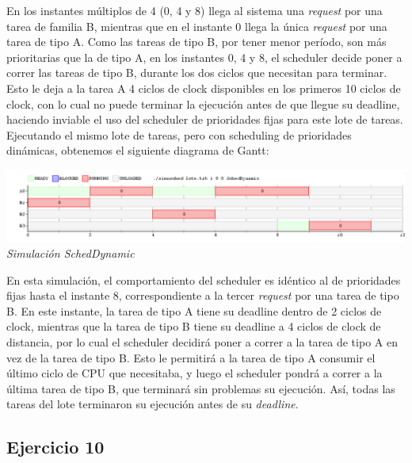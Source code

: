 En los instantes m\'ultiplos de 4 (0, 4 y 8) llega al sistema una \textit{request} por una tarea de familia B, mientras que en el instante 0 llega la \'unica 
\textit{request} por una tarea de tipo A. Como las tareas de tipo B, por tener menor per\'iodo, son m\'as prioritarias que la de tipo A, en los instantes
0, 4 y 8, el scheduler decide poner a correr las tareas de tipo B, durante los dos ciclos que necesitan para terminar. Esto le deja a la tarea A
4 ciclos de clock disponibles en los primeros 10 ciclos de clock, con lo cual no puede terminar la ejecuci\'on antes de que llegue su deadline,
haciendo inviable el uso del scheduler de prioridades fijas para este lote de tareas.
\\
Ejecutando el mismo lote de tareas, pero con scheduling de prioridades din\'amicas, obtenemos el siguiente diagrama de Gantt:

\vspace{\baselineskip}
\begin{center}
\includegraphics[scale=0.45]{../tp1/Test/ejercicio9-2.png}
\\
\vspace{1pt}
\footnotesize\textit{Simulaci\'on SchedDynamic}
\end{center}
\vspace{\baselineskip}

En esta simulaci\'on, el comportamiento del scheduler es id\'entico al de prioridades fijas hasta el instante 8, correspondiente a la tercer \textit{request}
por una tarea de tipo B. En este instante, la tarea de tipo A tiene su deadline dentro de 2 ciclos de clock, mientras que la tarea de tipo B tiene
su deadline a 4 ciclos de clock de distancia, por lo cual el scheduler decidir\'a poner a correr a la tarea de tipo A en vez de la tarea de tipo B.
Esto le permitir\'a a la tarea de tipo A consumir el \'ultimo ciclo de CPU que necesitaba, y luego el scheduler pondr\'a a correr a la \'ultima
tarea de tipo B, que terminar\'a sin problemas su ejecuci\'on. As\'i, todas las tareas del lote terminaron su ejecuci\'on antes de su \textit{deadline}.

\subsection{Ejercicio 10}